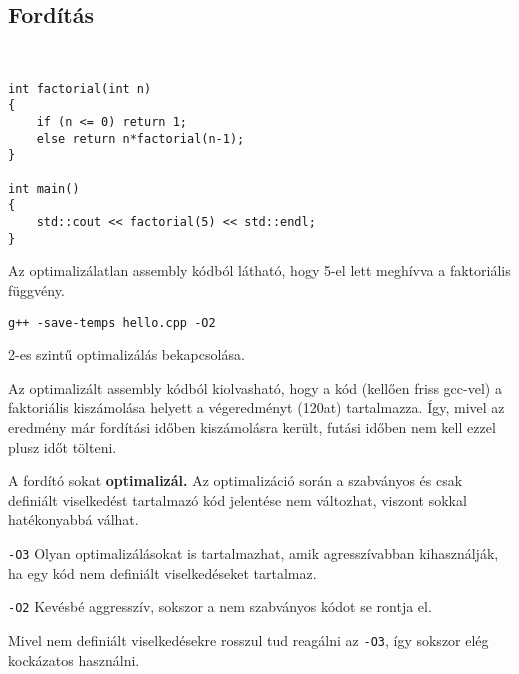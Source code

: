 \documentclass[a4paper,11.5pt]{article}
\begin{document}
	\subsection{Fordítás}
	\begin{example}\
		
		\begin{lstlisting}
int factorial(int n)
{
	if (n <= 0) return 1;
	else return n*factorial(n-1);
}

int main()
{
	std::cout << factorial(5) << std::endl;
}
		\end{lstlisting}
		
		Az optimalizálatlan assembly kódból látható, hogy 5-el lett meghívva a faktoriális függvény.
		\begin{note}
			\texttt{g++ -save-temps hello.cpp -O2}
			
			2-es szintű optimalizálás bekapcsolása.
		\end{note}
		
     Az optimalizált assembly kódból kiolvasható, hogy a kód (kellően friss gcc-vel) a faktoriális kiszámolása helyett a végeredményt (120at) tartalmazza. Így, mivel az eredmény már fordítási időben kiszámolásra került, futási időben nem kell ezzel plusz időt tölteni.
		
		A fordító sokat \textbf{optimalizál.} Az optimalizáció során a szabványos és csak definiált viselkedést tartalmazó kód jelentése nem változhat, viszont sokkal hatékonyabbá válhat.
	\end{example} 
	\begin{note}
		\texttt{-O3} Olyan optimalizálásokat is tartalmazhat, amik agresszívabban kihasználják, ha egy kód nem definiált viselkedéseket tartalmaz.
		
		\texttt{-O2} Kevésbé aggresszív, sokszor a nem szabványos kódot se rontja el.
		
		Mivel nem definiált viselkedésekre rosszul tud reagálni az \texttt{-O3}, így sokszor elég kockázatos használni.
	\end{note}
	
\end{document}
